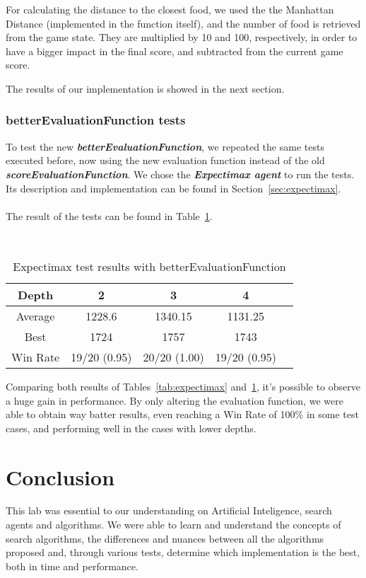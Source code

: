 \documentclass{article}
\begin{document}
For calculating the distance to the closest food, we used the the Manhattan Distance (implemented in the function itself), and the number of food is retrieved from the game state. They are multiplied by 10 and 100, respectively, in order to have a bigger impact in the final score, and subtracted from the current game score.

The results of our implementation is showed in the next section.

\subsubsection{betterEvaluationFunction tests}

To test the new \textit\textbf{{betterEvaluationFunction}}, we repeated the same tests executed before, now using the new evaluation function instead of the old \textit\textbf{{scoreEvaluationFunction}}. We chose the \textit\textbf{{Expectimax agent}} to run the tests. Its description and implementation can be found in Section~\ref{sec:expectimax}.
~\\
~\\
The result of the tests can be found in Table~\ref{tab:expectimax-better}.

~\\
\begin{table}[!ht]
  \begin{center}
    \begin{tabular}{||c||c|c|c|c||}
      \hline
      Depth & 2 & 3 & 4 \\
      \hline\hline
      Average &  1228.6 &  1340.15 &  1131.25 \\
      \hline\hline
      Best & 1724 & 1757 & 1743 \\
      \hline\hline
      Win Rate & 19/20 (0.95) & 20/20 (1.00) & 19/20 (0.95) \\
      \hline
    \end{tabular}
    \caption{Expectimax test results with betterEvaluationFunction}
    \label{tab:expectimax-better}
  \end{center}
\end{table}

Comparing both results of Tables~\ref{tab:expectimax} and~\ref{tab:expectimax-better}, it's possible to observe a huge gain in performance. By only altering the evaluation function, we were able to obtain way batter results, even reaching a Win Rate of 100\% in some test cases, and performing well in the cases with lower depths.

\pagebreak
\section{Conclusion}

This lab was essential to our understanding on Artificial Inteligence, search agents and algorithms. We were able to learn and understand the concepts of search algorithms, the differences and nuances between all the algorithms proposed and, through various tests, determine which implementation is the best, both in time and performance.
\end{document}
